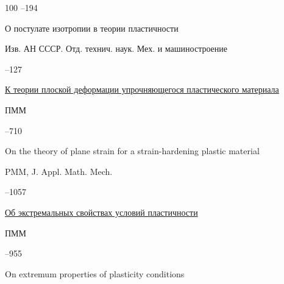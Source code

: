\begin{thebibliography}{100}
--194 






\paper О постулате изотропии в теории пластичности 

\jour Изв. АН СССР. Отд. технич. наук. Мех. и машиностроение



–127






\paper \href{https://zbmath.org/?q=an:0104.40605}{К теории плоской деформации упрочняющегося пластического материала}

\jour ПММ




–710


\transl


\paper On the theory of plane strain for a strain-hardening plastic material

\jour PMM, J. Appl. Math. Mech. 


--1057 






\paper \href{https://zbmath.org/?q=an:0104.40602}{Об экстремальных свойствах условий пластичности}

\jour ПММ




–955


\transl


\paper On extremum properties of plasticity conditions


\end{thebibliography}
